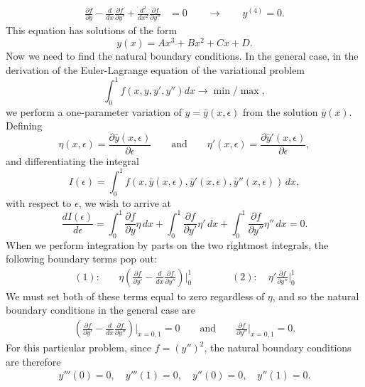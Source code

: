\documentclass[10pt,letterpaper]{report}
\newcommand{\so}{\qquad \rightarrow \qquad}
\newcommand{\pp}[2]{\frac{\partial{#1}}{\partial{#2}}}
\begin{document}
\begin{enumerate}
\begin{align*}
\pp{f}{y} - \frac{d}{dx}\pp{f}{y'} + \frac{d^2}{dx^2}\pp{f}{y''} &= 0
\so y^{(4)} = 0.
\end{align*}
This equation has solutions of the form
\[
y(x) = Ax^3 + Bx^2 + Cx + D.
\]
Now we need to find the natural boundary conditions. In the general case, in the derivation of the Euler-Lagrange equation of the variational problem 
\[
\int_{0}^{1}f(x, y, y', y'')dx \to \min/\max,
\]
we perform a one-parameter variation of $y = \bar y(x, \epsilon)$ from the solution $\bar y(x)$. Defining
\[
\eta(x, \epsilon) = \frac{\partial \bar y(x, \epsilon)}{\partial \epsilon} \qquad \textrm{and} \qquad \eta'(x, \epsilon) = \frac{\partial \bar y'(x, \epsilon)}{\partial \epsilon},
\]
and differentiating the integral 
\[
I(\epsilon) = \int_{0}^{1}f(x, \bar y(x, \epsilon), \bar y'(x, \epsilon), \bar y''(x, \epsilon))\,dx,
\]
with respect to $\epsilon$, we wish to arrive at
\[
\frac{dI(\epsilon)}{d\epsilon} = \int_{0}^{1}\frac{\partial f}{\partial y}\eta\,dx + \int_{0}^{1}\frac{\partial f}{\partial y'}\eta'\,dx + \int_{0}^{1}\frac{\partial f}{\partial y''}\eta''\,dx = 0.
\]
When we perform integration by parts on the two rightmost integrals, the following boundary terms pop out:
\begin{align*}
    (1): &\quad \eta \left(\pp{f}{y'} - \frac{d}{dx}\frac{\partial f}{\partial y''}\right)\bigg\vert_{0}^1  \qquad \qquad
    (2): \quad \eta'\frac{\partial f}{\partial y''}\bigg\vert_{0}^{1}
\end{align*}
We must set both of these terms equal to zero regardless of $\eta$, and so the natural boundary conditions in the general case are 
\begin{align*}
    \left(\pp{f}{y'} - \frac{d}{dx}\frac{\partial f}{\partial y''}\right)\bigg\vert_{x = 0, 1} = 0 \qquad \textrm{and} \qquad
    \frac{\partial f}{\partial y''}\bigg\vert_{x = 0, 1} = 0.
\end{align*}
For this particular problem, since $f = (y'')^2$, the natural boundary conditions are therefore
\begin{align*}
    y'''(0) = 0, \quad y'''(1) = 0, \quad y''(0) = 0, \quad y''(1) = 0.
\end{align*}



\end{enumerate}
\end{document}
